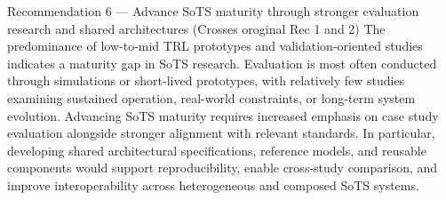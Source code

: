 Recommendation 6 —  Advance SoTS maturity through stronger evaluation research and shared architectures (Crosses oroginal Rec 1 and 2)
The predominance of low-to-mid TRL prototypes and validation-oriented studies indicates a maturity gap in SoTS research. Evaluation is most often conducted through simulations or short-lived prototypes, with relatively few studies examining sustained operation, real-world constraints, or long-term system evolution. Advancing SoTS maturity requires increased emphasis on case study evaluation alongside stronger alignment with relevant standards. In particular, developing shared architectural specifications, reference models, and reusable components would support reproducibility, enable cross-study comparison, and improve interoperability across heterogeneous and composed SoTS systems.



